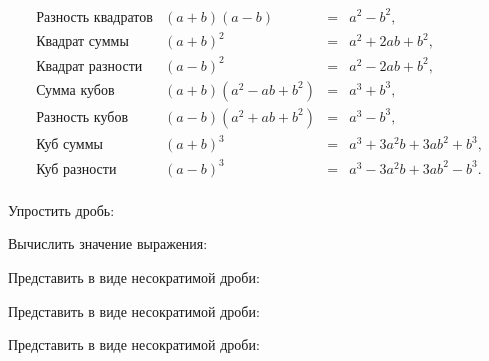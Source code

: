 \begin{listofex}
\[\begin{array}{cccc}
		\text{Разность квадратов}&(a+b)(a-b)& =&a^2-b^2,\\
		\text{Квадрат суммы}&(a+b)^2& =&a^2+2ab+b^2,\\
		\text{Квадрат разности}&(a-b)^2& =&a^2-2ab+b^2,\\
		\text{Сумма кубов}&(a+b)(a^2-ab+b^2)& =&a^3+b^3,\\
		\text{Разность кубов}&(a-b)(a^2+ab+b^2)& =&a^3-b^3,\\
		\text{Куб суммы}&(a+b)^3& =&a^3+3a^2b+3ab^2+b^3,\\
		\text{Куб разности}&(a-b)^3& =&a^3-3a^2b+3ab^2-b^3.\\
	\end{array} \]
	\item Упростить дробь:
	\begin{enumcols}[itemcolumns=3]
		\item {}
		\item {}
		\item {}
		\item {}
		\item {}
		\item {}
	\end{enumcols}
	\item Вычислить значение выражения:
	\begin{enumcols}[itemcolumns=1]
		\item {}
		\item {}
	\end{enumcols}
	\newpage
	\item Представить в виде несократимой дроби:
	\begin{enumcols}[itemcolumns=2]
		\item {}
		\item {}
		\item {}
		\item {}
		\item {}
		\item {}
		\item {}
		\item {}
	\end{enumcols}
	\item Представить в виде несократимой дроби:
	\begin{enumcols}[itemcolumns=3]
		\item {}
		\item {}
		\item {}
	\end{enumcols}
	\item Представить в виде несократимой дроби:
	\begin{enumcols}[itemcolumns=3]
		\item {}
		\item {}
		\item {}
	\end{enumcols}
\end{listofex}
